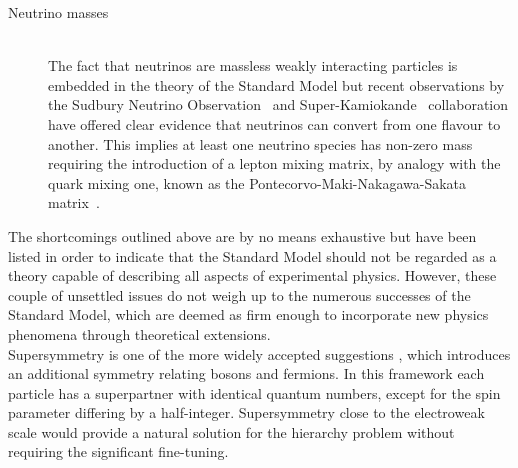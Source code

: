 \begin{myindentpar}
\begin{description}
    \item[Neutrino masses] \hfill \\
    The fact that neutrinos are massless weakly interacting particles is embedded in the theory of the Standard Model but recent observations by the Sudbury Neutrino Observation~\cite{SNOCollab} and Super-Kamiokande~\cite{SuperKamiokande} collaboration have offered clear evidence that neutrinos can convert from one flavour to another. This implies at least one neutrino species has non-zero mass requiring the introduction of a lepton mixing matrix, by analogy with the quark mixing one, known as the Pontecorvo-Maki-Nakagawa-Sakata matrix~\cite{NeutrinoMatrix1, NeutrinoMatrix2}.
        
   \end{description}
\end{myindentpar}
The shortcomings outlined above are by no means exhaustive but have been listed in order to indicate that the Standard Model should not be regarded as a theory capable of describing all aspects of experimental physics. However, these couple of unsettled issues do not weigh up to the numerous successes of the Standard Model, which are deemed as firm enough to incorporate new physics phenomena through theoretical extensions.
\\
Supersymmetry is one of the more widely accepted suggestions%
, which introduces an additional symmetry relating bosons and fermions.
In this framework each particle has a superpartner with identical quantum numbers, except for the spin parameter differing by a half-integer.
Supersymmetry close to the electroweak scale would provide a natural solution for the hierarchy problem without requiring the significant fine-tuning.
